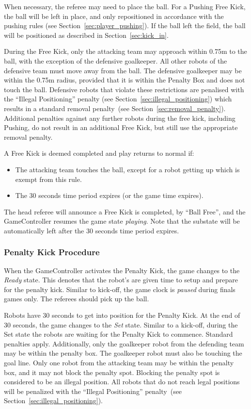 \documentclass[12pt]{article}
\newcommand{\cf}{see\xspace}
\newcommand{\FreeKickTime}{30 seconds\xspace}
\newcommand{\FreeKickRadius}{0.75m\xspace}
\newcommand{\PenaltyFreeKickSetupTime}{30 seconds\xspace}
\begin{document}
When necessary, the referee may need to place the ball.
For a Pushing Free Kick, the ball will be left in place, and only repositioned in accordance with the pushing rules (see Section~\ref{sec:player_pushing}).
If the ball left the field, the ball will be positioned as described in Section~\ref{sec:kick_in}.

During the Free Kick, only the attacking team may approach within \FreeKickRadius to the ball, with the exception of the defensive goalkeeper. All other robots of the defensive team must move away from the ball. The defensive goalkeeper may be within the \FreeKickRadius radius, provided that it is within the Penalty Box and does not touch the ball. Defensive robots that violate these restrictions are penalised with the ``Illegal Positioning'' penalty (see Section~\ref{sec:illegal_positioning}) which results in a standard removal penalty~(see Section~\ref{sec:removal_penalty}).
Additional penalties against any further robots during the free kick, including Pushing, do not result in an additional Free Kick, but still use the appropriate removal penalty.

A Free Kick is deemed completed and play returns to normal if:
\begin{itemize}
    \item The attacking team touches the ball, except for a robot getting up which is exempt from this rule.
    \item The \FreeKickTime time period expires (or the game time expires).
\end{itemize}
The head referee will announce a Free Kick is completed, by ``Ball Free'', and the GameController
resumes the game state \emph{playing}. Note that the substate will be automatically left after the \FreeKickTime time period expires.

\subsubsection{Penalty Kick Procedure}
\label{sec:penalty_free_kick}

When the GameController activates the Penalty Kick, the game changes to the \textit{Ready} state.
This denotes that the robot's are given time to setup and prepare for the penalty kick.
Similar to kick-off, the game clock is \textit{paused} during finals games only.
The referees should pick up the ball.

Robots have \PenaltyFreeKickSetupTime to get into position for the Penalty Kick. At the end of 30 seconds, the game changes to the \textit{Set} state.
Similar to a kick-off, during the Set state the robots are waiting for the Penalty Kick to commence.
Standard penalties apply.
Additionally, only the goalkeeper robot from the defending team may be within the penalty box. The goalkeeper robot must also be touching the goal line.
Only one robot from the attacking team may be within the penalty box, and it may not block the penalty spot.
Blocking the penalty spot is considered to be an illegal position.
All robots that do not reach legal positions will be penalized with the ``Illegal Positioning'' penalty~(\cf Section~\ref{sec:illegal_positioning}).
\end{document}
